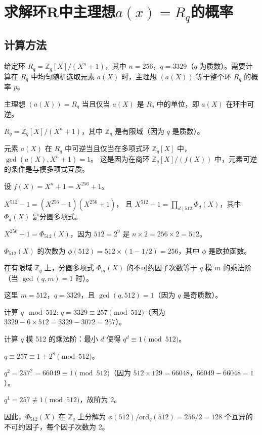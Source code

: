 \documentclass[12pt,a4paper]{article}
\numberwithin{equation}{section}
\begin{document}
\section[求解环R中主理想a(x)=Rq的概率]{求解环R中主理想$a(x)=R_q$的概率}
\subsection{计算方法}

给定环 $R_q = \mathbb{Z}_q[X]/(X^n + 1)$，其中 $n = 256$，$q = 3329$（$q$ 为质数）。需要计算在 $R_q$ 中均匀随机选取元素 $a(X)$ 时，主理想 $(a(X))$ 等于整个环 $R_q$ 的概率 $p$。

主理想 $(a(X)) = R_q$ 当且仅当 $a(X)$ 是 $R_q$ 中的单位，即 $a(X)$ 在环中可逆。

$R_q = \mathbb{Z}_q[X]/(X^n + 1)$，其中 $\mathbb{Z}_q$ 是有限域（因为 $q$ 是质数）。

元素 $a(X)$ 在 $R_q$ 中可逆当且仅当在多项式环 $\mathbb{Z}_q[X]$ 中，$\gcd(a(X), X^n + 1) = 1$。
这是因为在商环 $\mathbb{Z}_q[X]/(f(X))$ 中，元素可逆的条件是与模多项式互质。

设 $f(X) = X^n + 1 = X^{256} + 1$。

$X^{512} - 1 = (X^{256} - 1)(X^{256} + 1)$，
且 $X^{512} - 1 = \prod_{d \mid 512} \Phi_d(X)$，其中 $\Phi_d(X)$ 是分圆多项式。

$X^{256} + 1 = \Phi_{512}(X)$，因为 $512 = 2^9$ 是 $n \times 2 = 256 \times 2 = 512$。

$\Phi_{512}(X)$ 的次数为 $\phi(512) = 512 \times (1 - 1/2) = 256$，其中 $\phi$ 是欧拉函数。

在有限域 $\mathbb{Z}_q$ 上，分圆多项式 $\Phi_m(X)$ 的不可约因子次数等于 $q$ 模 $m$ 的乘法阶（当 $\gcd(q, m) = 1$ 时）。

这里 $m = 512$，$q = 3329$，且 $\gcd(q, 512) = 1$（因为 $q$ 是奇质数）。

计算 $q \mod 512$: $q = 3329 \equiv 257 \pmod{512}$（因为 $3329 - 6 \times 512 = 3329 - 3072 = 257$）。

计算 $q$ 模 512 的乘法阶：最小 $d$ 使得 $q^d \equiv 1 \pmod{512}$。

$q \equiv 257 \equiv 1 + 2^8 \pmod{512}$。

$q^2 = 257^2 = 66049 \equiv 1 \pmod{512}$（因为 $512 \times 129 = 66048$，$66049 - 66048 = 1$）。

$q^1 = 257 \not\equiv 1 \pmod{512}$，故阶为 2。

因此，$\Phi_{512}(X)$ 在 $\mathbb{Z}_q$ 上分解为 $\phi(512) / \text{ord}_q(512) = 256 / 2 = 128$ 个互异的不可约因子，每个因子次数为 2。
\end{document}
